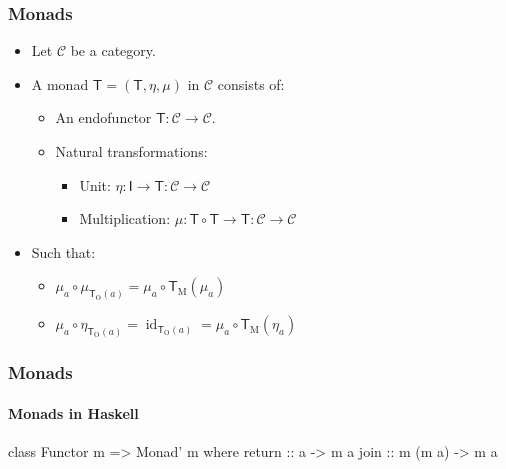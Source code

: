 \documentclass{beamer}
\DeclareMathOperator{\obj}{O}
\DeclareMathOperator{\mor}{M}
\DeclareMathOperator{\id}{id}
\newcommand{\idO}[1]{\natO{\id}{#1}}
\newcommand{\comp}{\ensuremath{\mathrel{\circ}}}
\newcommand{\cat}[1]{\ensuremath{\mathcal{#1}}}
\newcommand{\func}[1]{\ensuremath{\mathsf{#1}}}
\newcommand{\funcO}[1]{\ensuremath{\func{#1}_{\obj}}}
\newcommand{\funcM}[1]{\ensuremath{\func{#1}_{\mor}}}
\newcommand{\nat}[1]{\ensuremath{#1}}
\newcommand{\natO}[2]{\ensuremath{\nat{#1}_{#2}}}
\newcommand{\mon}[1]{\func{#1}}
\begin{document}
\begin{frame}
  \frametitle{Monads}

  \begin{definition}[Monad]
    \begin{itemize}
    \item
      Let \cat{C} be a category.
    \item
      A monad $\mon{T} = (\func{T}, \nat{\eta}, \nat{\mu})$ in \cat{C}
      consists of:
      \begin{itemize}
      \item
        An endofunctor $\func{T}: \cat{C} \to \cat{C}$.
      \item
        Natural transformations:
        \begin{itemize}
        \item
          Unit: $\nat{\eta}: \func{I} \to \func{T}: \cat{C} \to
          \cat{C}$
        \item
          Multiplication: $\nat{\mu}: \func{T \comp T} \to \func{T}:
          \cat{C} \to \cat{C}$
        \end{itemize}
      \end{itemize}
    \item
      Such that:
      \begin{itemize}
      \item
        $\natO{\mu}{a} \comp \natO{\mu}{\funcO{T}(a)} = \natO{\mu}{a}
        \comp \funcM{T}(\natO{\mu}{a})$
      \item
        $\natO{\mu}{a} \comp \natO{\eta}{\funcO{T}(a)} =
        \idO{\funcO{T}(a)} = \natO{\mu}{a} \comp
        \funcM{T}(\natO{\eta}{a})$
      \end{itemize}
    \end{itemize}
  \end{definition}

\end{frame}


\begin{frame}[fragile]
  \frametitle{Monads}
  \framesubtitle{Monads in Haskell}

  \begin{definition}
    \begin{code}
class Functor m => Monad' m where
  return :: a -> m a
  join   :: m (m a) -> m a
    \end{code}
  \end{definition}

\end{frame}
\end{document}
